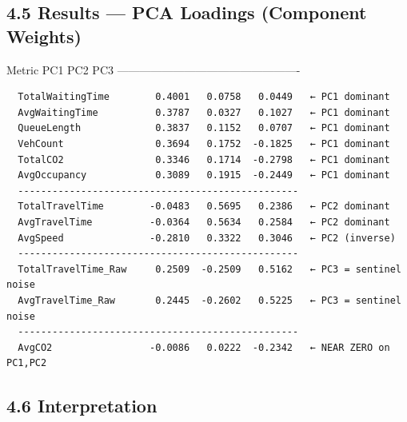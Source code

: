 \documentclass[11pt,a4paper]{article}
\begin{document}
\subsection*{4.5 Results — PCA Loadings (Component Weights)}
Metric                  PC1      PC2      PC3
-------------------------------------------------
\vspace{1em}\begin{verbatim}
  TotalWaitingTime        0.4001   0.0758   0.0449   ← PC1 dominant
  AvgWaitingTime          0.3787   0.0327   0.1027   ← PC1 dominant
  QueueLength             0.3837   0.1152   0.0707   ← PC1 dominant
  VehCount                0.3694   0.1752  -0.1825   ← PC1 dominant
  TotalCO2                0.3346   0.1714  -0.2798   ← PC1 dominant
  AvgOccupancy            0.3089   0.1915  -0.2449   ← PC1 dominant
  -------------------------------------------------
  TotalTravelTime        -0.0483   0.5695   0.2386   ← PC2 dominant
  AvgTravelTime          -0.0364   0.5634   0.2584   ← PC2 dominant
  AvgSpeed               -0.2810   0.3322   0.3046   ← PC2 (inverse)
  -------------------------------------------------
  TotalTravelTime_Raw     0.2509  -0.2509   0.5162   ← PC3 = sentinel noise
  AvgTravelTime_Raw       0.2445  -0.2602   0.5225   ← PC3 = sentinel noise
  -------------------------------------------------
  AvgCO2                 -0.0086   0.0222  -0.2342   ← NEAR ZERO on PC1,PC2

\end{verbatim}
\subsection*{4.6 Interpretation}
\end{document}
